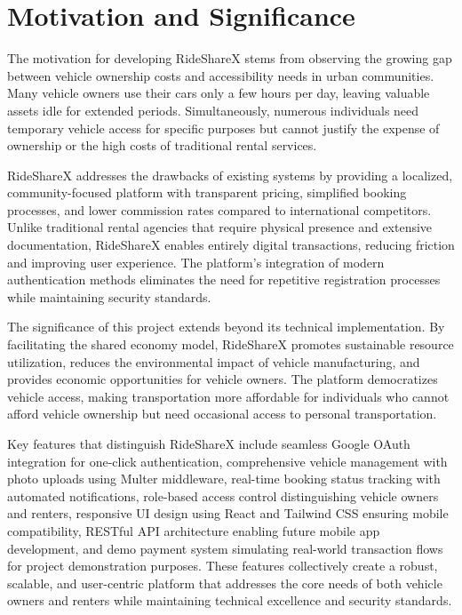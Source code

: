 \documentclass[12pt,a4paper]{report}
\begin{document}
	\section{Motivation and Significance}
	The motivation for developing RideShareX stems from observing the growing gap between vehicle ownership costs and accessibility needs in urban communities. Many vehicle owners use their cars only a few hours per day, leaving valuable assets idle for extended periods. Simultaneously, numerous individuals need temporary vehicle access for specific purposes but cannot justify the expense of ownership or the high costs of traditional rental services.
	
	RideShareX addresses the drawbacks of existing systems by providing a localized, community-focused platform with transparent pricing, simplified booking processes, and lower commission rates compared to international competitors. Unlike traditional rental agencies that require physical presence and extensive documentation, RideShareX enables entirely digital transactions, reducing friction and improving user experience. The platform's integration of modern authentication methods eliminates the need for repetitive registration processes while maintaining security standards.
	
	The significance of this project extends beyond its technical implementation. By facilitating the shared economy model, RideShareX promotes sustainable resource utilization, reduces the environmental impact of vehicle manufacturing, and provides economic opportunities for vehicle owners. The platform democratizes vehicle access, making transportation more affordable for individuals who cannot afford vehicle ownership but need occasional access to personal transportation.
	
	Key features that distinguish RideShareX include seamless Google OAuth integration for one-click authentication, comprehensive vehicle management with photo uploads using Multer middleware, real-time booking status tracking with automated notifications, role-based access control distinguishing vehicle owners and renters, responsive UI design using React and Tailwind CSS ensuring mobile compatibility, RESTful API architecture enabling future mobile app development, and demo payment system simulating real-world transaction flows for project demonstration purposes. These features collectively create a robust, scalable, and user-centric platform that addresses the core needs of both vehicle owners and renters while maintaining technical excellence and security standards.
	
\end{document}
